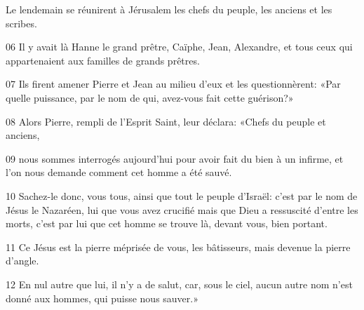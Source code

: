 Le lendemain se réunirent à Jérusalem les chefs du peuple, les anciens et les scribes.

06 Il y avait là Hanne le grand prêtre, Caïphe, Jean, Alexandre, et tous ceux qui appartenaient aux familles de grands prêtres.

07 Ils firent amener Pierre et Jean au milieu d’eux et les questionnèrent: «Par quelle puissance, par le nom de qui, avez-vous fait cette guérison?»

08 Alors Pierre, rempli de l’Esprit Saint, leur déclara: «Chefs du peuple et anciens,

09 nous sommes interrogés aujourd’hui pour avoir fait du bien à un infirme, et l’on nous demande comment cet homme a été sauvé.

10 Sachez-le donc, vous tous, ainsi que tout le peuple d’Israël: c’est par le nom de Jésus le Nazaréen, lui que vous avez crucifié mais que Dieu a ressuscité d’entre les morts, c’est par lui que cet homme se trouve là, devant vous, bien portant.

11 Ce Jésus est la pierre méprisée de vous, les bâtisseurs, mais devenue la pierre d’angle.

12 En nul autre que lui, il n’y a de salut, car, sous le ciel, aucun autre nom n’est donné aux hommes, qui puisse nous sauver.»